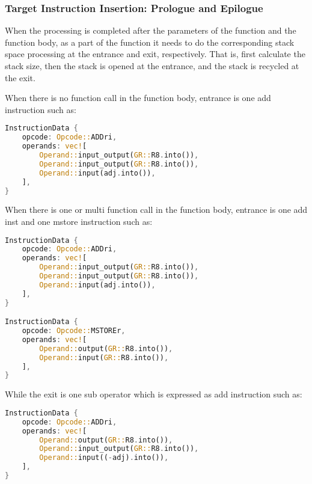 \subsubsection{Target Instruction Insertion: Prologue and Epilogue}

When the processing is completed after the parameters of the function and the function body, 
as a part of the function it needs to do the corresponding stack space processing at the entrance and exit, respectively.
That is, first calculate the stack size, then the stack is opened at the entrance, and the stack is recycled at the exit.

When there is no function call in the function body, entrance is one add instruction such as:
\begin{lstlisting}[language=rust]
InstructionData {
    opcode: Opcode::ADDri,
    operands: vec![
        Operand::input_output(GR::R8.into()),
        Operand::input_output(GR::R8.into()),
        Operand::input(adj.into()),
    ],
}
\end{lstlisting}

When there is one or multi function call in the function body, entrance is one add inst and one mstore instruction such as:
\begin{lstlisting}[language=rust]
InstructionData {
    opcode: Opcode::ADDri,
    operands: vec![
        Operand::input_output(GR::R8.into()),
        Operand::input_output(GR::R8.into()),
        Operand::input(adj.into()),
    ],
}

InstructionData {
    opcode: Opcode::MSTOREr,
    operands: vec![
        Operand::output(GR::R8.into()),
        Operand::input(GR::R8.into()),
    ],
}
\end{lstlisting}

While the exit is one sub operator which is expressed as add instruction such as:
\begin{lstlisting}[language=rust]
InstructionData {
    opcode: Opcode::ADDri,
    operands: vec![
        Operand::output(GR::R8.into()),
        Operand::input_output(GR::R8.into()),
        Operand::input((-adj).into()),
    ],
}
\end{lstlisting}
